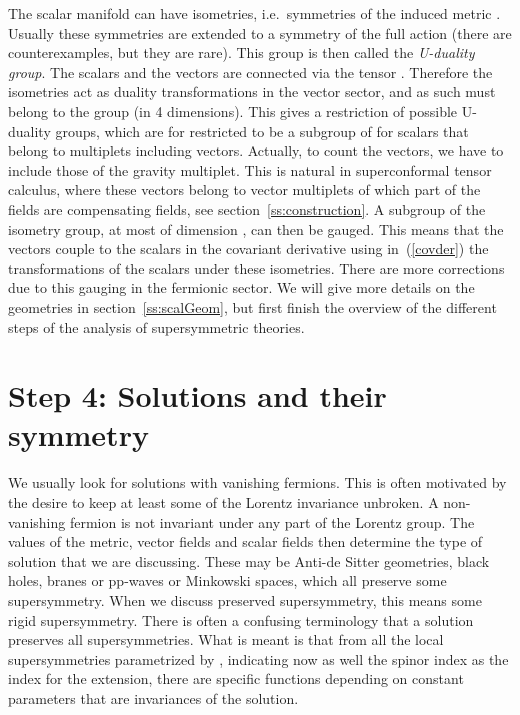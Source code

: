 \documentclass[a4paper,11pt,twoside]{article}
\providecommand{\Red}[1]{#1}
\providecommand{\OliveGreen}[1]{#1}
\def\rmd{{\rm d}}
\providecommand{\Symp}{\mathop{\rm {}Sp}}
\begin{document}
The scalar manifold can have isometries, i.e.\ symmetries of the induced
metric \myHighlight{$\rmd s^2=\Red{g_{uv}(\varphi )}\,\rmd \Red{\varphi ^u}\,\rmd
\Red{\varphi ^v}$}\coordHE{}. Usually these symmetries are extended to a symmetry of
the full action (there are counterexamples, but they are rare). This
group is then called the \emph{U-duality group}. The scalars and the
vectors are connected via the tensor \myHighlight{$\Red{\mathcal{N}_{IJ}(\varphi )}$}\coordHE{}.
Therefore the isometries act as duality transformations in the vector
sector, and as such must belong to the \myHighlight{$\Symp(2m,\mathbb{R})$}\coordHE{} group (in 4
dimensions). This gives a restriction of possible U-duality groups, which
are for \coordHE{} restricted to be a subgroup of \myHighlight{$\Symp(2m,\mathbb{R})$}\coordHE{} for
scalars that belong to multiplets including vectors. Actually, to count
the \coordHE{} vectors, we have to include those of the gravity multiplet. This
is natural in superconformal tensor calculus, where these vectors belong
to vector multiplets of which part of the fields are compensating fields,
see section~\ref{ss:construction}. A subgroup of the isometry group, at
most of dimension \coordHE{}, can then be gauged. This means that the vectors
couple to the scalars in the covariant derivative using in~(\ref{covder})
the transformations of the scalars under these isometries. There are more
corrections due to this gauging in the fermionic sector. We will give
more details on the geometries in section~\ref{ss:scalGeom}, but first
finish the overview of the different steps of the analysis of
supersymmetric theories.


\section{Step 4: Solutions and their symmetry} \label{ss:solutions}

We usually look for solutions with vanishing fermions. This is often
motivated by the desire to keep at least some of the Lorentz invariance
unbroken. A non-vanishing fermion is not invariant under any part of the
Lorentz group. The values of the metric, vector fields and scalar fields
then determine the type of solution that we are discussing. These may be
Anti-de Sitter geometries, black holes, branes or pp-waves or Minkowski
spaces, which all preserve some supersymmetry. When we discuss preserved
supersymmetry, this means some rigid supersymmetry. There is often a
confusing terminology that a solution preserves all supersymmetries. What
is meant is that from all the local supersymmetries parametrized by
\myHighlight{$\OliveGreen{\epsilon^i_\alpha} (x)$}\coordHE{}, indicating now as well the spinor
index \coordHE{} as the index \coordHE{} for the
extension, there are specific functions depending on \coordHE{} constant
parameters that are invariances of the solution.
\end{document}
